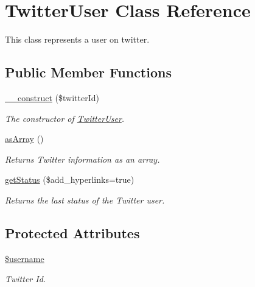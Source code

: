 \hypertarget{class_twitter_user}{
\section{TwitterUser Class Reference}
\label{class_twitter_user}
}
This class represents a user on twitter.  


\subsection*{Public Member Functions}
\begin{CompactItemize}
\item 
\hyperlink{class_twitter_user_ac09b350e318425625ba5766fdd28118}{\_\-\_\-construct} (\$twitterId)
\begin{CompactList}\small\item\em The constructor of \hyperlink{class_twitter_user}{TwitterUser}. \item\end{CompactList}\item 
\hyperlink{class_twitter_user_0badd8e7ffdf4e7c30f4954d782efc21}{asArray} ()
\begin{CompactList}\small\item\em Returns Twitter information as an array. \item\end{CompactList}\item 
\hyperlink{class_twitter_user_dee94bac47124658a438a57f9ceb0fae}{getStatus} (\$add\_\-hyperlinks=true)
\begin{CompactList}\small\item\em Returns the last status of the Twitter user. \item\end{CompactList}\end{CompactItemize}
\subsection*{Protected Attributes}
\begin{CompactItemize}
\item 
\hyperlink{class_twitter_user_344e34fc6dcf01c488347d4146cd8de9}{\$username}
\begin{CompactList}\small\item\em Twitter Id. \item\end{CompactList}\end{CompactItemize}


